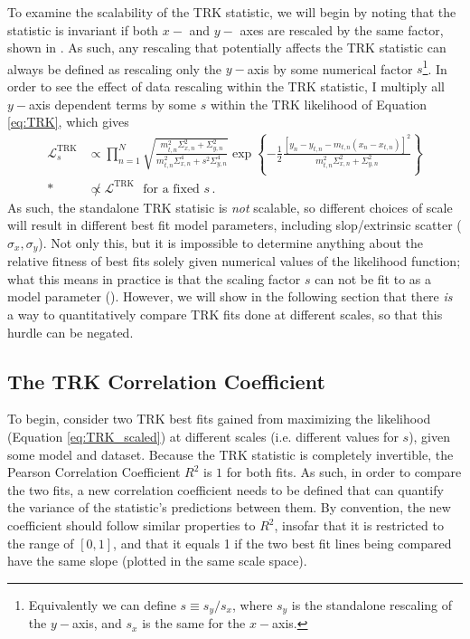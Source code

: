 To examine the scalability of the TRK statistic, we will begin by noting that the statistic is invariant if both $x-$ and $y-$ axes are rescaled by the same factor, shown in \textcite{trotter}. As such, any rescaling that potentially affects the TRK statistic can always be defined as rescaling only the $y-$axis by some numerical factor $s$\footnote{Equivalently we can define $s\equiv s_y/s_x$, where $s_y$ is the standalone rescaling of the $y-$axis, and $s_x$ is the same for the $x-$axis.}. In order to see the effect of data rescaling within the TRK statistic, I multiply all $y-$axis dependent terms by some $s$ within the TRK likelihood of Equation \eqref{eq:TRK}, which gives
\begin{align}\label{eq:TRK_scaled}
\mathcal{L}_s^{\mathrm {TRK}} & \propto \prod_{n=1}^N{ \sqrt{\frac{m_{t,n}^2\Sigma_{x,n}^2+\Sigma_{y,n}^2}{m_{t,n}^2\Sigma_{x,n}^4+s^2\Sigma_{y,n}^4}}\exp\left\{-\frac{1}{2}\frac{\left[y_n-y_{t,n}-m_{t,n}(x_n-x_{t,n})\right]^2}{m_{t,n}^2\Sigma_{x,n}^2+\Sigma_{y,n}^2}\right\}} \nonumber \\*
& \not\propto \mathcal{L}^{\mathrm {TRK}} \mbox{~~for a fixed $s$}\, .
\end{align}
As such, the standalone TRK statisic is \textit{not} scalable, so different choices of scale will result in different best fit model parameters, including slop/extrinsic scatter ($\sigma_x,\sigma_y$). Not only this, but it is impossible to determine anything about the relative fitness of best fits solely given numerical values of the likelihood function; what this means in practice is that the scaling factor $s$ can not be fit to as a model parameter (\textcite{trotter}). However, we will show in the following section that there \textit{is} a way to quantitatively compare TRK fits done at different scales, so that this hurdle can be negated.

\subsection{The TRK Correlation Coefficient}
\label{sec:TRKcorr}
To begin, consider two TRK best fits gained from maximizing the likelihood (Equation \eqref{eq:TRK_scaled}) at different scales (i.e. different values for $s$), given some model and dataset. Because the TRK statistic is completely invertible, the Pearson Correlation Coefficient $R^2$ is $1$ for both fits. As such, in order to compare the two fits,  a new correlation coefficient needs to be defined that can quantify the variance of the statistic's predictions between them. By convention, the new coefficient should follow similar properties to $R^2$, insofar that it is restricted to the range of $[0,1]$, and that it equals 1 if the two best fit lines being compared have the same slope (plotted in the same scale space).

